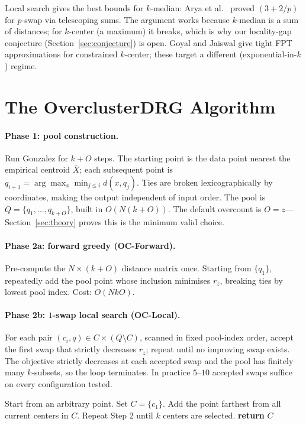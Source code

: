 \documentclass[twoside,leqno,twocolumn]{article}
\newcommand{\rz}{r_z}
\begin{document}
Local search gives the best bounds for $k$-median: Arya et al.\
\cite{arya2004} proved $(3+2/p)$ for $p$-swap via telescoping sums.
The argument works because $k$-median is a sum of distances; for
$k$-center (a maximum) it breaks, which is why our locality-gap
conjecture (Section~\ref{sec:conjecture}) is open. Goyal and Jaiswal
\cite{goyal2021} give tight FPT approximations for constrained
$k$-center; these target a different (exponential-in-$k$) regime.


\section{The OverclusterDRG Algorithm}
\label{sec:algorithm}

\paragraph{Phase 1: pool construction.}
Run Gonzalez for $k+O$ steps. The starting point is the data point
nearest the empirical centroid $\bar{X}$; each subsequent point is
$q_{i+1}=\arg\max_x\min_{j\le i}d(x,q_j)$. Ties are broken
lexicographically by coordinates, making the output independent of
input order. The pool is $Q=\{q_1,\dots,q_{k+O}\}$, built in
$O(N(k{+}O))$. The default overcount is $O=z$---Section~\ref{sec:theory}
proves this is the minimum valid choice.

\paragraph{Phase 2a: forward greedy (OC-Forward).}
Pre-compute the $N\times(k{+}O)$ distance matrix once. Starting from
$\{q_1\}$, repeatedly add the pool point whose inclusion minimises
$\rz$, breaking ties by lowest pool index. Cost: $O(NkO)$.

\paragraph{Phase 2b: $1$-swap local search (OC-Local).}
For each pair $(c_i,q)\in C\times(Q\setminus C)$, scanned in
fixed pool-index order, accept the first swap that strictly decreases
$\rz$; repeat until no improving swap exists. The objective strictly
decreases at each accepted swap and the pool has finitely many
$k$-subsets, so the loop terminates. In practice $5$--$10$ accepted
swaps suffice on every configuration tested.

\begin{algorithm}[t]
\caption{Gonzalez$(X, k)$}
\label{alg:gonzalez}
\begin{algorithmic}[1]
\STATE Start from an arbitrary point. Set $C = \{c_1\}$.
\STATE Add the point farthest from all current centers in $C$.
\STATE Repeat Step 2 until $k$ centers are selected.
\STATE \textbf{return} $C$
\end{algorithmic}
\end{algorithm}
\end{document}
